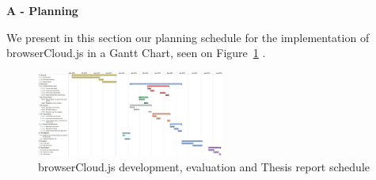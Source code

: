 
% 
% 

\newpage
\textbf{A - Planning}

We present in this section our planning schedule for the implementation of browserCloud.js in a Gantt Chart, seen on Figure~\ref{fig:gantt} .


\begin{figure}[h!]
  \centering
  \includegraphics[angle=90,width=0.55\textwidth]{img/gantt.jpg}
  \caption{browserCloud.js development, evaluation and Thesis report schedule}
  \label{fig:gantt}
\end{figure}

